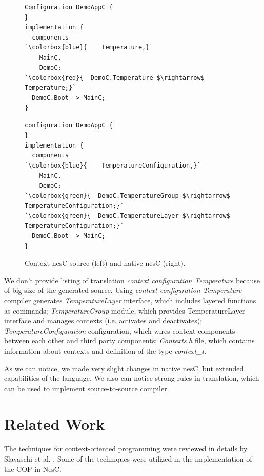 \documentclass[12pt,a4paper]{article}
\begin{document}
\begin{figure}[H]
\begin{multicols}{2}
\begin{lstlisting}
Configuration DemoAppC {
}
implementation {
  components
`\colorbox{blue}{    Temperature,}`
    MainC,
    DemoC;
`\colorbox{red}{  DemoC.Temperature $\rightarrow$ Temperature;}`
  DemoC.Boot -> MainC;
}
\end{lstlisting}
\columnbreak
\begin{lstlisting}
configuration DemoAppC {
}
implementation {
  components 
`\colorbox{blue}{    TemperatureConfiguration,}`
    MainC,
    DemoC;
`\colorbox{green}{  DemoC.TemperatureGroup $\rightarrow$ TemperatureConfiguration;}`
`\colorbox{green}{  DemoC.TemperatureLayer $\rightarrow$ TemperatureConfiguration;}`
  DemoC.Boot -> MainC;
}
\end{lstlisting}
\end{multicols}
\caption{Context nesC source (left) and native nesC (right).}
\label{fig:cuec}
\end{figure}

We don't provide listing of translation \textit{context configuration Temperature} because of big size of the generated source. Using \textit{context configuration Temperature} compiler generates \textit{TemperatureLayer} interface, which includes layered functions as commands; \textit{TemperatureGroup} module, which provides TemperatureLayer interface and manages contexts (i.e. activates and deactivates); \textit{TemperatureConfiguration} configuration, which wires context components between each other and third party components; \textit{Contexts.h} file, which contains information about contexts and definition of the type \textit{context\_t}.

As we can notice, we made very slight changes in native nesC, but extended capabilities of the language. We also can notice strong rules in translation, which can be used to implement source-to-source compiler.

\section{Related Work}
\paragraph{}
The techniques for context-oriented programming were reviewed in details by Slavaschi et al. \cite{salvaneschi12}. Some of the techniques were utilized in the implementation of the COP in NesC.
\end{document}
